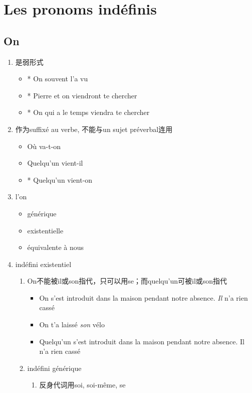 \documentclass[UTF8]{report}
\begin{document}
\section{Les pronoms indéfinis}
\subsection{On}
\begin{enumerate}
    \item 是弱形式
    \begin{itemize}
        \item * On souvent l’a vu
        \item * Pierre et on viendront te chercher
        \item * On qui a le temps viendra te chercher
    \end{itemize}
    \item 作为suffixé au verbe, 不能与un sujet préverbal连用
    \begin{itemize}
        \item Où va-t-on
        \item Quelqu’un vient-il
        \item * Quelqu’un vient-on
    \end{itemize}
    \item l'on 
    \begin{itemize}
        \item générique
        \item existentielle
        \item équivalente à nous
    \end{itemize}
    \item indéfini existentiel
    \begin{enumerate}
    \item On不能被il或son指代，只可以用se；而quelqu’un可被il或son指代
    \begin{itemize}
        \item On s'est introduit dans la maison pendant notre absence. \textit{Il} n'a rien cassé
        \item On t'a laissé \textit{son} vélo
        \item Quelqu’un s’est introduit dans la maison pendant notre absence. Il n’a rien cassé
    \end{itemize}
    \item indéfini générique
    \begin{enumerate}
        \item 反身代词用soi, soi-même, se

\end{enumerate}
\end{enumerate}
\end{enumerate}
\end{document}
